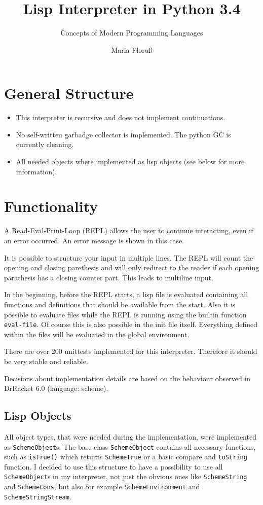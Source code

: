 \documentclass[12pt,a4paper]{scrartcl}
\begin{document}
\title{Lisp Interpreter in Python 3.4}
\subtitle{Concepts of Modern Programming Languages}
\author{Maria Floru\ss}
\maketitle
\newpage

\section{General Structure}
\begin{itemize}
\item This interpreter is recursive and does not implement continuations. 
\item No self-written garbadge collector is implemented. The python GC is currently cleaning.
\item All needed objects where implemented as lisp objects (see below for more information).
\end{itemize}

\section{Functionality}
A Read-Eval-Print-Loop (REPL) allows the user to continue interacting, even if an error occurred. An error message is shown in this case.

It is possible to structure your input in multiple lines. The REPL will count the opening and closing parethesis and will only redirect to the reader if each opening parathesis has a closing counter part. This leads to multiline input.

In the beginning, before the REPL starts, a lisp file is evaluated containing all functions and definitions that should be available from the start. Also it is possible to evaluate files while the REPL is running using the builtin function \lstinline{eval-file}. Of course this is also possible in the init file itself. Everything defined within the files will be evaluated in the global environment.

There are over 200 unittests implemented for this interpreter. Therefore it should be very stable and reliable. 

Decisions about implementation details are based on the behaviour observed in DrRacket 6.0 (language: scheme).

\subsection{Lisp Objects}
All object types, that were needed during the implementation, were implemented as \lstinline{SchemeObject}s. The base class \lstinline{SchemeObject} contains all necessary functions, such as \lstinline{isTrue()} which returns \lstinline{SchemeTrue} or a basic compare and \lstinline{toString} function. I decided to use this structure to have a possibility to use all \lstinline{SchemeObject}s in my interpreter, not just the obvious ones like \lstinline{SchemeString} and \lstinline{SchemeCons}, but also for example \lstinline{SchemeEnvironment} and \lstinline{SchemeStringStream}. 
\end{document}
